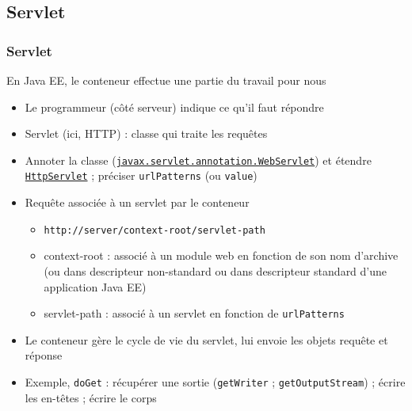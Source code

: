 \documentclass[english, french]{beamer}
\begin{document}
\subsection{Servlet}
\begin{frame}
	\frametitle{Servlet}
	En Java EE, le conteneur effectue une partie du travail pour nous
	\begin{itemize}
		\item Le programmeur (côté serveur) indique ce qu’il faut répondre
		\item Servlet (ici, HTTP) : classe qui traite les requêtes
		\item Annoter la classe (\href{https://docs.oracle.com/javaee/7/api/index.html?javax/servlet/annotation/WebServlet.html}{\texttt{javax.servlet.annotation.WebServlet}}) et étendre \href{https://docs.oracle.com/javaee/7/api/index.html?javax/servlet/http/HttpServlet.html}{\texttt{HttpServlet}} ; préciser \texttt{urlPatterns} (ou \texttt{value})
		\item Requête associée à un servlet par le conteneur
		\begin{itemize}
			\item \texttt{http://server/context-root/servlet-path}
			\item context-root : associé à un module web en fonction de son nom d’archive (ou dans descripteur non-standard ou dans descripteur standard d’une application Java EE)
			\item servlet-path : associé à un servlet en fonction de \texttt{urlPatterns}
		\end{itemize}
		\item Le conteneur gère le cycle de vie du servlet, lui envoie les objets requête et réponse
		\item Exemple, \texttt{doGet} : récupérer une sortie (\texttt{getWriter} ; \texttt{getOutputStream}) ; écrire les en-têtes ; écrire le corps
	\end{itemize}
\end{frame}
\end{document}
